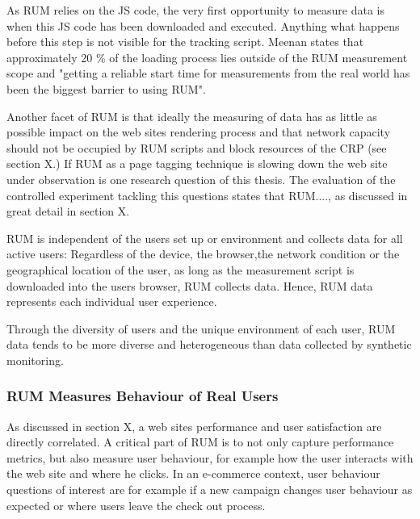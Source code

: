 As RUM relies on the JS code, the very first opportunity to measure data is when this JS code has been downloaded and executed.
Anything what happens before this step is not visible for the tracking script.
Meenan states that approximately 20 \% of the loading process lies outside of the RUM measurement scope and "getting a reliable start time for measurements from the real world has been the biggest barrier to using RUM".%

Another facet of RUM is that ideally the measuring of data has as little as possible impact on the web sites rendering process and that network capacity should not be occupied by RUM scripts and block resources of the CRP (see section X.) %
If RUM as a page tagging technique is slowing down the web site under observation is one research question of this thesis.
The evaluation of the controlled experiment tackling this questions states that RUM...., as discussed in great detail in section X. %



RUM is independent of the users set up or environment and collects data for all active users:
Regardless of the device, the browser,the network condition or the geographical location of the user, as long as the measurement script is downloaded into the users browser, RUM collects data.%
Hence, RUM data represents each individual user experience. %

Through the diversity of users and the unique environment of each user,  RUM data tends to be more diverse and heterogeneous than data collected by synthetic monitoring. %



\subsubsection{RUM Measures Behaviour of Real Users}



As discussed in section X, a web sites performance and user satisfaction are directly correlated.
A critical part of RUM is to not only capture performance metrics, but also measure user behaviour, for example how the user interacts with the web site and where he clicks. %
In an e-commerce context, user behaviour questions of interest are for example if a new campaign changes user behaviour as expected or where users leave the check out process. %

